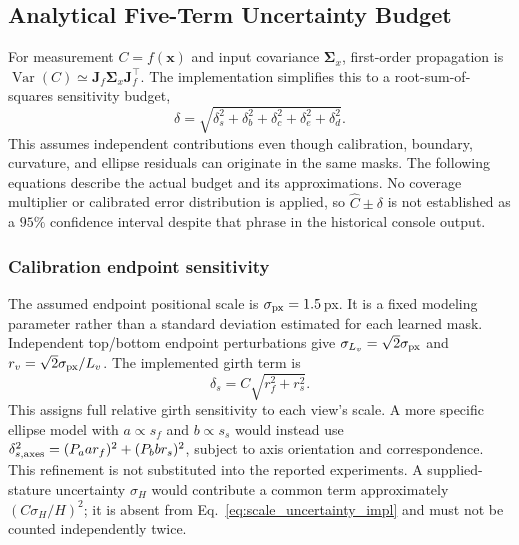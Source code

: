 \subsection{Analytical Five-Term Uncertainty Budget}
\label{subsec:uncertainty_budget}
For measurement $C=f(\mathbf x)$ and input covariance $\mathbf\Sigma_x$, first-order propagation is $\operatorname{Var}(C)\simeq\mathbf J_f\mathbf\Sigma_x\mathbf J_f^\top$. The implementation simplifies this to a root-sum-of-squares sensitivity budget,
\begin{equation}
\delta=\sqrt{\delta_s^2+\delta_b^2+\delta_c^2+\delta_e^2+\delta_d^2}.
\label{eq:total_quadrature}
\end{equation}
This assumes independent contributions even though calibration, boundary, curvature, and ellipse residuals can originate in the same masks. The following equations describe the actual budget and its approximations. No coverage multiplier or calibrated error distribution is applied, so $\hat C\pm\delta$ is not established as a $95\%$ confidence interval despite that phrase in the historical console output.

\subsubsection{Calibration endpoint sensitivity}
The assumed endpoint positional scale is $\sigma_{\rm px}=1.5$\,px. It is a fixed modeling parameter rather than a standard deviation estimated for each learned mask. Independent top/bottom endpoint perturbations give $\sigma_{L_v}=\sqrt2\sigma_{\rm px}$ and $r_v=\sqrt2\sigma_{\rm px}/L_v$. The implemented girth term is
\begin{equation}
\delta_s=C\sqrt{r_f^2+r_s^2}.
\label{eq:scale_uncertainty_impl}
\end{equation}
This assigns full relative girth sensitivity to each view's scale. A more specific ellipse model with $a\propto s_f$ and $b\propto s_s$ would instead use $\delta_{s,\rm axes}^2=(P_a a r_f)^2+(P_b b r_s)^2$, subject to axis orientation and correspondence. This refinement is not substituted into the reported experiments. A supplied-stature uncertainty $\sigma_H$ would contribute a common term approximately $(C\sigma_H/H)^2$; it is absent from Eq.~\eqref{eq:scale_uncertainty_impl} and must not be counted independently twice.

